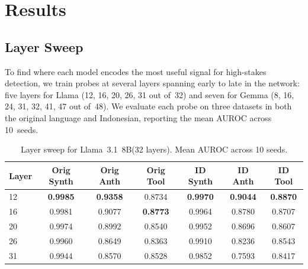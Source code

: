 \documentclass{article}
\newcommand{\auroc}{AUROC\xspace}
\newcommand{\llama}{Llama~3.1~8B\xspace}
\begin{document}
\section{Results}
\label{sec:results}

\subsection{Layer Sweep}
\label{sec:layer_sweep}

To find where each model encodes the most useful signal for high-stakes
detection, we train probes at several layers spanning early to late in
the network: five layers for Llama (12, 16, 20, 26, 31 out of~32) and
seven for Gemma (8, 16, 24, 31, 32, 41, 47 out of~48).
We evaluate each probe on three datasets in both the original language
and Indonesian, reporting the mean \auroc across 10~seeds.

\begin{table}[t]
\centering
\caption{Layer sweep for \llama (32 layers). Mean \auroc across 10 seeds.}
\label{tab:llama_sweep}
\begin{tabular}{lcccccc}
\toprule
Layer & Orig Synth & Orig Anth & Orig Tool & ID Synth & ID Anth & ID Tool \\
\midrule
12 & \textbf{0.9985} & \textbf{0.9358} & 0.8734 & \textbf{0.9970} & \textbf{0.9044} & \textbf{0.8870} \\
16          & 0.9981          & 0.9077          & \textbf{0.8773} & 0.9964          & 0.8780          & 0.8707          \\
20          & 0.9974          & 0.8992          & 0.8540          & 0.9952          & 0.8696          & 0.8607          \\
26          & 0.9960          & 0.8649          & 0.8363          & 0.9910          & 0.8236          & 0.8543          \\
31          & 0.9944          & 0.8570          & 0.8528          & 0.9852          & 0.7593          & 0.8417          \\
\bottomrule
\end{tabular}
\end{table}
\end{document}
